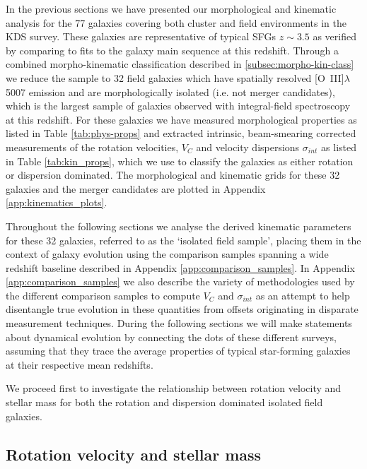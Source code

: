 \documentclass[fleqn,usenatbib]{mn2e}
\begin{document}
In the previous sections we have presented our morphological and kinematic analysis for the 77 galaxies covering both cluster and field environments in the KDS survey.
These galaxies are representative of typical SFGs $z\sim3.5$ as verified by comparing to fits to the galaxy main sequence at this redshift.
Through a combined morpho-kinematic classification described in \cref{subsec:morpho-kin-class} we reduce the sample to 32 field galaxies which have spatially resolved [O~{\sc III}]$\lambda$5007 emission and are morphologically isolated (i.e. not merger candidates), which is the largest sample of galaxies observed with integral-field spectroscopy at this redshift.
For these galaxies we have measured morphological properties as listed in Table \ref{tab:phys-props} and extracted intrinsic, beam-smearing corrected measurements of the rotation velocities, $V_{C}$ and velocity dispersions $\sigma_{int}$ as listed in Table \ref{tab:kin_props}, which we use to classify the galaxies as either rotation or dispersion dominated.
The morphological and kinematic grids for these 32 galaxies and the merger candidates are plotted in Appendix \ref{app:kinematics_plots}.

Throughout the following sections we analyse the derived kinematic parameters for these 32 galaxies, referred to as the `isolated field sample', placing them in the context of galaxy evolution using the comparison samples spanning a wide redshift baseline described in Appendix \ref{app:comparison_samples}.
In Appendix \ref{app:comparison_samples} we also describe the variety of methodologies used by the different comparison samples to compute $V_{C}$ and $\sigma_{int}$ as an attempt to help disentangle true evolution in these quantities from offsets originating in disparate measurement techniques.
During the following sections we will make statements about dynamical evolution by connecting the dots of these different surveys, assuming that they trace the average properties of typical star-forming galaxies at their respective mean redshifts.

We proceed first to investigate the relationship between rotation velocity and stellar mass for both the rotation and dispersion dominated isolated field galaxies.

\subsection{Rotation velocity and stellar mass}\label{subsec:results_rotation_vel}
\end{document}
